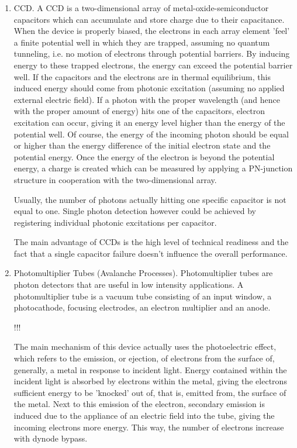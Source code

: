 \begin{enumerate}[i]
	\item \ac{CCD}. A \acs{CCD} is a two-dimensional array of metal-oxide-semiconductor capacitors which can accumulate and store charge due to their capacitance. When the device is properly biased, the electrons in each array element 'feel' a finite potential well in which they are trapped, assuming no quantum tunneling, i.e. no motion of electrons through potential barriers. By inducing energy to these trapped electrons, the energy can exceed the potential barrier well. If the capacitors and the electrons are in thermal equilibrium, this induced energy should come from photonic excitation (assuming no applied external electric field). If a photon with the proper wavelength (and hence with the proper amount of energy) hits one of the capacitors, electron excitation can occur, giving it an energy level higher than the energy of the potential well. Of course, the energy of the incoming photon should be equal or higher than the energy difference of the initial electron state and the potential energy. Once the energy of the electron is beyond the potential energy, a charge is created which can be measured by applying a PN-junction structure in cooperation with the two-dimensional array. 
	
Usually, the number of photons actually hitting one specific capacitor is not equal to one. Single photon detection however could be achieved by registering individual photonic excitations per capacitor. 

The main advantage of \acs{CCD}s is the high level of technical readiness and the fact that a single capacitor failure doesn't influence the overall performance.

\item Photomultiplier Tubes (Avalanche Processes). Photomultiplier tubes are photon detectors that are useful in low intensity applications. A photomultiplier tube is a vacuum tube consisting of an input window, a photocathode, focusing electrodes, an electron multiplier and an anode. 

\picture!!!

The main mechanism of this device actually uses the photoelectric effect, which refers to the emission, or ejection, of electrons from the surface of, generally, a metal in response to incident light. Energy contained within the incident light is absorbed by electrons within the metal, giving the electrons sufficient energy to be 'knocked' out of, that is, emitted from, the surface of the metal. Next to this emission of the electron, secondary emission is induced due to the appliance of an electric field into the tube, giving the incoming electrons more energy. This way, the number of electrons increase with dynode bypass. 


\end{enumerate}
